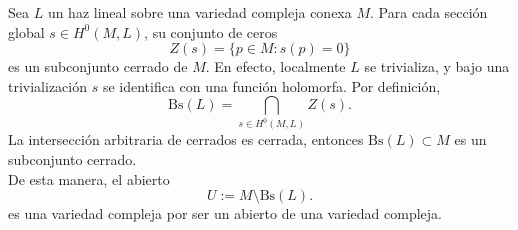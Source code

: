 	\begin{remark}
		Sea $L$ un haz lineal sobre una variedad compleja conexa $M$. Para cada sección global $ s\in H^0(M,L) $, su conjunto de ceros
		\begin{equation*}
			Z(s)=\{p\in M: s(p)=0\}
		\end{equation*}
		es un subconjunto cerrado de $M$. En efecto, localmente $L$ se trivializa, y bajo una trivialización $s$ se identifica con una función 
		holomorfa. Por definición,
		\begin{equation*}
			\mathrm{Bs}(L)=\bigcap_{s\in H^0(M,L)} Z(s).
		\end{equation*}
		La intersección arbitraria de cerrados es cerrada, entonces $\mathrm{Bs}(L)\subset M$ es un subconjunto cerrado.\\
		De esta manera, el abierto
		\begin{equation*}
			U:=M\setminus \mathrm{Bs}(L).
		\end{equation*}
		es una variedad compleja por ser un abierto de una variedad compleja.

	\end{remark}

